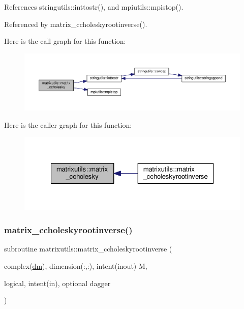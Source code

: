References stringutils\+::inttostr(), and mpiutils\+::mpistop().



Referenced by matrix\+\_\+ccholeskyrootinverse().

Here is the call graph for this function\+:
\nopagebreak
\begin{figure}[H]
\begin{center}
\leavevmode
\includegraphics[width=350pt]{namespacematrixutils_ad7a37503ef0aeeef3585caccc253c428_cgraph}
\end{center}
\end{figure}
Here is the caller graph for this function\+:
\nopagebreak
\begin{figure}[H]
\begin{center}
\leavevmode
\includegraphics[width=326pt]{namespacematrixutils_ad7a37503ef0aeeef3585caccc253c428_icgraph}
\end{center}
\end{figure}
\mbox{\label{namespacematrixutils_a3d8668e32abacfbeeeaaca90c120a129}} 
\subsubsection{\texorpdfstring{matrix\+\_\+ccholeskyrootinverse()}{matrix\_ccholeskyrootinverse()}}
{\footnotesize\ttfamily subroutine matrixutils\+::matrix\+\_\+ccholeskyrootinverse (\begin{DoxyParamCaption}\item[{complex(\mbox{\hyperlink{namespacematrixutils_a7bdc564986ea4d90f51201c75606ef3d}{dm}}), dimension(\+:,\+:), intent(inout)}]{M,  }\item[{logical, intent(in), optional}]{dagger }\end{DoxyParamCaption})}



